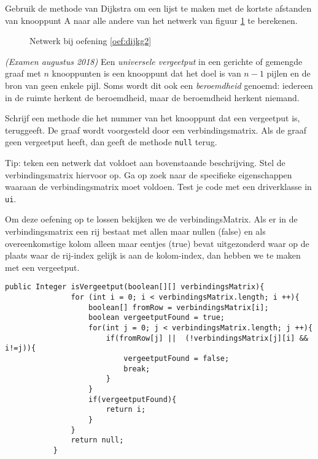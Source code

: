 \begin{oef}
\label{oef:dijkg2}
\papier Gebruik de methode van Dijkstra om een lijst te maken met de kortste afstanden van knooppunt A naar alle andere van het netwerk van figuur \ref{fig:oefDijkg2} te berekenen.
\begin{figure}[htbp]
\centering

\caption{Netwerk bij oefening \ref{oef:dijkg2}}
\label{fig:oefDijkg2}
\end{figure}
\end{oef}


\begin{oef}
\code \emph{(Examen augustus 2018)} Een \emph{universele vergeetput} in een gerichte of gemengde graaf met $n$ knooppunten is een knooppunt dat het doel is van $n-1$ pijlen en de bron van geen enkele pijl. Soms wordt dit ook een \emph{beroemdheid} genoemd: iedereen in de ruimte herkent de beroemdheid, maar de beroemdheid herkent niemand. 

Schrijf een methode die het nummer van het knooppunt dat een vergeetput is, teruggeeft. De graaf wordt voorgesteld door een verbindingsmatrix. Als de graaf geen vergeetput heeft, dan geeft de methode \verb+null+ terug.

Tip: teken een netwerk dat voldoet aan bovenstaande beschrijving. Stel de verbindingsmatrix hiervoor op. Ga op zoek naar de specifieke eigenschappen waaraan de verbindingsmatrix moet voldoen. Test je code met een driverklasse in \verb+ui+.
\begin{opl}
Om deze oefening op te lossen bekijken we de verbindingsMatrix. Als er in de verbindingsmatrix een rij bestaat met allen maar nullen (false) en als overeenkomstige kolom alleen maar eentjes (true) bevat uitgezonderd waar op de plaats waar de rij-index gelijk is aan de kolom-index, dan hebben we te maken met een vergeetput.
     \begin{lstlisting}[caption={isVergeetput(verbindingsMatrix) methode}, label=bstaddnode]
          public Integer isVergeetput(boolean[][] verbindingsMatrix){
               for (int i = 0; i < verbindingsMatrix.length; i ++){
                   boolean[] fromRow = verbindingsMatrix[i];
                   boolean vergeetputFound = true;
                   for(int j = 0; j < verbindingsMatrix.length; j ++){
                       if(fromRow[j] ||  (!verbindingsMatrix[j][i] && i!=j)){
                           vergeetputFound = false;
                           break;
                       }
                   }
                   if(vergeetputFound){
                       return i;
                   }
               }
               return null;
           }
          \end{lstlisting}

\end{opl}
\end{oef}



